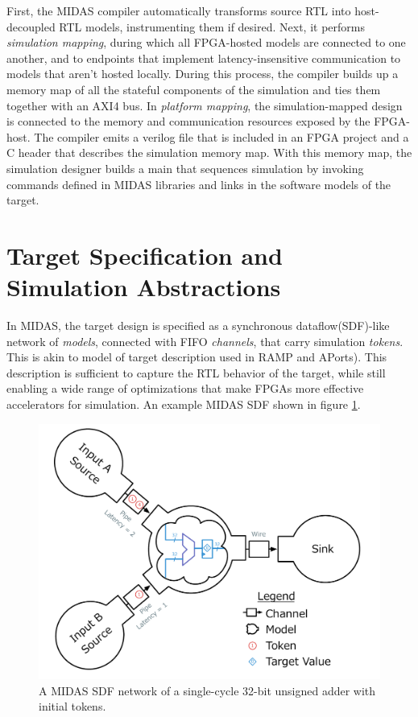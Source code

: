 First, the MIDAS compiler automatically transforms source RTL into
host-decoupled RTL models, instrumenting them if desired. Next, it performs
\emph{simulation mapping}, during which all FPGA-hosted models are connected to
one another, and to endpoints that implement latency-insensitive communication
to models that aren't hosted locally. During this process, the compiler builds
up a memory map of all the stateful components of the simulation and ties them
together with an AXI4 bus. In \emph{platform mapping}, the simulation-mapped
design is connected to the memory and communication resources exposed by the
FPGA-host. The compiler emits a verilog file that is included in an FPGA
project and a C header that describes the simulation memory map.  With this
memory map, the simulation designer builds a main that sequences simulation by
invoking commands defined in MIDAS libraries and links in the software models
of the target.

\section{Target Specification and Simulation Abstractions}\label{sec:sdf}

In MIDAS, the target design is specified as a synchronous dataflow(SDF)-like
network of \emph{models}, connected with FIFO \emph{channels}, that carry
simulation \emph{tokens}. This is akin to model of target description used in
RAMP\cite{ramp} and APorts\cite{APortNetworks}). This description is sufficient
to capture the RTL behavior of the target, while still enabling a wide range of
optimizations that make FPGAs more effective accelerators for simulation. An example MIDAS SDF shown in figure
\ref{fig:adder-example}.

\begin{figure}
	\centering
	\includegraphics[width=16cm]{figures/adder-example.pdf}
    \caption{A MIDAS SDF network of a single-cycle 32-bit unsigned adder with initial tokens.}
	\label{fig:adder-example}
\end{figure}

